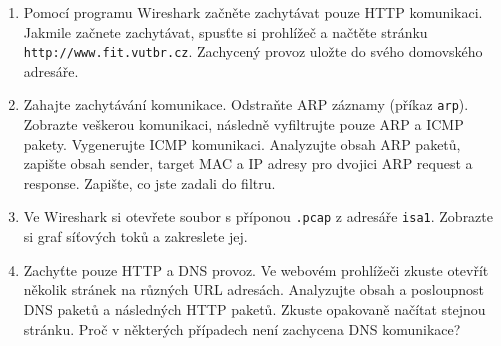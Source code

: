 \begin{enumerate}
\item Pomocí programu Wireshark začněte zachytávat pouze HTTP komunikaci. Jakmile začnete zachytávat, spusťte si prohlížeč a načtěte stránku \texttt{http://www.fit.vutbr.cz}. Zachycený provoz uložte do svého domovského adresáře.
\item Zahajte zachytávání komunikace. Odstraňte ARP záznamy (příkaz \texttt{arp}). Zobrazte veškerou komunikaci, následně vyfiltrujte pouze ARP a ICMP pakety. Vygenerujte ICMP komunikaci. Analyzujte obsah ARP paketů, zapište obsah sender, target MAC a IP adresy pro dvojici ARP request a response. Zapište, co jste zadali do filtru.
\item Ve Wireshark si otevřete soubor s příponou \texttt{.pcap} z adresáře \texttt{isa1}. Zobrazte si graf síťových toků a zakreslete jej.
\item Zachyťte pouze HTTP a DNS provoz. Ve webovém prohlížeči zkuste otevřít několik stránek na různých URL adresách. Analyzujte obsah a posloupnost DNS paketů a následných HTTP paketů. Zkuste opakovaně načítat stejnou stránku. Proč v některých případech není zachycena DNS komunikace?
\end{enumerate}

